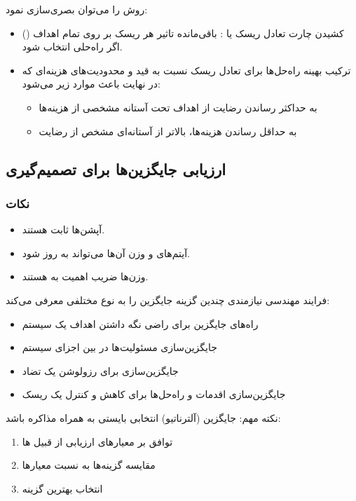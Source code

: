 روش  را می‌توان بصری‌سازی نمود:

\begin{itemize}
    \item کشیدن چارت تعادل ریسک یا : باقی‌مانده تاثیر هر
    ریسک بر روی تمام اهداف () اگر راه‌حلی  انتخاب شود.
    \item ترکیب بهینه راه‌حل‌ها برای تعادل ریسک نسبت به قید و محدودیت‌های
    هزینه‌ای که در نهایت باعث موارد زیر می‌شود: \begin{itemize} 
        \item به حداکثر رساندن رضایت از اهداف تحت آستانه مشخصی از هزینه‌ها
        \item به حداقل رساندن هزینه‌ها، بالاتر از آستانه‌ای مشخص از رضایت
    \end{itemize}
\end{itemize}

\subsection{ارزیابی جایگزین‌ها برای تصمیم‌گیری}

\subsubsection*{نکات}

\begin{itemize}
    \item آپشن‌ها ثابت هستند.
    \item آیتم‌های  و وزن آن‌ها می‌تواند به روز شود.
    \item وزن‌ها ضریب اهمیت به  هستند.
\end{itemize}

فرایند مهندسی نیازمندی چندین گزینه جایگزین را به نوع مختلفی معرفی می‌کند:

\begin{itemize}
    \item راه‌های جایگزین برای راضی نگه داشتن اهداف یک سیستم
    \item جایگزین‌سازی مسئولیت‌ها در بین اجزای سیستم
    \item جایگزین‌سازی برای رزولوشن یک تضاد
    \item جایگزین‌سازی اقدمات و راه‌حل‌ها برای کاهش و کنترل  یک ریسک
\end{itemize}

نکته مهم: جایگزین (آلترناتیو) انتخابی بایستی به همراه مذاکره باشد:

\begin{enumerate}
    \item توافق بر معیار‌های ارزیابی از قبیل ها
    \item مقایسه گزینه‌ها به نسبت معیار‌ها
    \item انتخاب بهترین گزینه
\end{enumerate}

